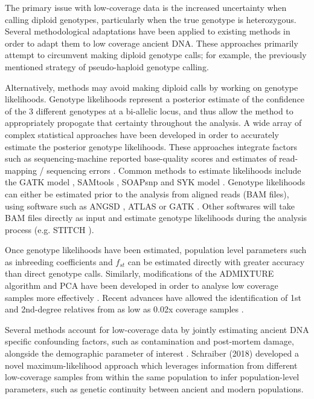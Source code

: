 The primary issue with low-coverage data is the increased uncertainty when calling diploid genotypes, particularly when the true genotype is heterozygous. Several methodological adaptations have been applied to existing methods in order to adapt them to low coverage ancient DNA. These approaches primarily attempt to circumvent making diploid genotype calls; for example, the previously mentioned strategy of pseudo-haploid genotype calling.

Alternatively, methods may avoid making diploid calls by working on genotype likelihoods. Genotype likelihoods represent a posterior estimate of the confidence of the 3 different genotypes at a bi-allelic locus, and thus allow the method to appropriately propogate that certainty throughout the analysis. A wide array of complex statistical approaches have been developed in order to accurately estimate the posterior genotype likelihoods. These approaches integrate factors such as sequencing-machine reported base-quality scores and estimates of read-mapping / sequencing errors \cite{McKenna2010}. Common methods to estimate likelihoods include the GATK model \cite{VanderAuwera2013}, SAMtools \cite{Li2009}, SOAPsnp \cite{Li2009a} and SYK model \cite{Kim2011}. Genotype likelihoods can either be estimated prior to the analysis from aligned reads (BAM files), using software such as ANGSD \cite{Korneliussen2014}, ATLAS \cite{Link2017} or GATK \cite{VanderAuwera2013}. Other softwares will take BAM files directly as input and estimate genotype likelihoods during the analysis process (e.g. STITCH \cite{Davies2016}). 

Once genotype likelihoods have been estimated, population level parameters such as inbreeding coefficients and $f_{st}$ can be estimated directly \cite{Korneliussen2014} with greater accuracy than direct genotype calls. Similarly, modifications of the ADMIXTURE \cite{Alexander2009} algorithm and PCA have been developed in order to analyse low coverage samples more effectively \cite{skotte2013estimating, zhang2021novel}. Recent advances have allowed the identification of 1st and 2nd-degree relatives from as low as 0.02x coverage samples \cite{fernandes2017identification, fernandes2021tkgwv2}. 

Several methods account for low-coverage data by jointly estimating ancient DNA specific confounding factors, such as contamination and  post-mortem damage, alongside the demographic parameter of interest \cite{Racimo2016}. Schraiber (2018) \cite{Schraiber2018} developed a novel maximum-likelihood approach which leverages information from different low-coverage samples from within the same population to infer population-level parameters, such as genetic continuity between ancient and modern populations.  
 
